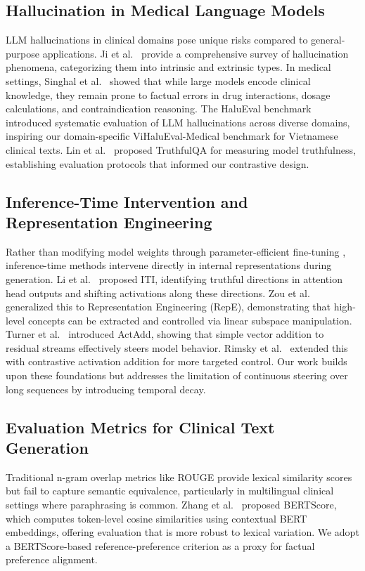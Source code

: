 \documentclass[conference]{IEEEtran}
\begin{document}
\subsection{Hallucination in Medical Language Models}
LLM hallucinations in clinical domains pose unique risks compared to general-purpose applications. Ji et al.~\cite{ref7} provide a comprehensive survey of hallucination phenomena, categorizing them into intrinsic and extrinsic types. In medical settings, Singhal et al.~\cite{ref3} showed that while large models encode clinical knowledge, they remain prone to factual errors in drug interactions, dosage calculations, and contraindication reasoning. The HaluEval benchmark \cite{ref14} introduced systematic evaluation of LLM hallucinations across diverse domains, inspiring our domain-specific ViHaluEval-Medical benchmark for Vietnamese clinical texts. Lin et al.~\cite{ref17} proposed TruthfulQA for measuring model truthfulness, establishing evaluation protocols that informed our contrastive design.

\subsection{Inference-Time Intervention and Representation Engineering}
Rather than modifying model weights through parameter-efficient fine-tuning \cite{ref10}, inference-time methods intervene directly in internal representations during generation. Li et al.~\cite{ref2} proposed ITI, identifying truthful directions in attention head outputs and shifting activations along these directions. Zou et al.~\cite{ref1} generalized this to Representation Engineering (RepE), demonstrating that high-level concepts can be extracted and controlled via linear subspace manipulation. Turner et al.~\cite{ref8} introduced ActAdd, showing that simple vector addition to residual streams effectively steers model behavior. Rimsky et al.~\cite{ref9} extended this with contrastive activation addition for more targeted control. Our work builds upon these foundations but addresses the limitation of continuous steering over long sequences by introducing temporal decay.

\subsection{Evaluation Metrics for Clinical Text Generation}
Traditional n-gram overlap metrics like ROUGE \cite{ref15} provide lexical similarity scores but fail to capture semantic equivalence, particularly in multilingual clinical settings where paraphrasing is common. Zhang et al.~\cite{ref16} proposed BERTScore, which computes token-level cosine similarities using contextual BERT embeddings, offering evaluation that is more robust to lexical variation. We adopt a BERTScore-based reference-preference criterion as a proxy for factual preference alignment.
\end{document}
